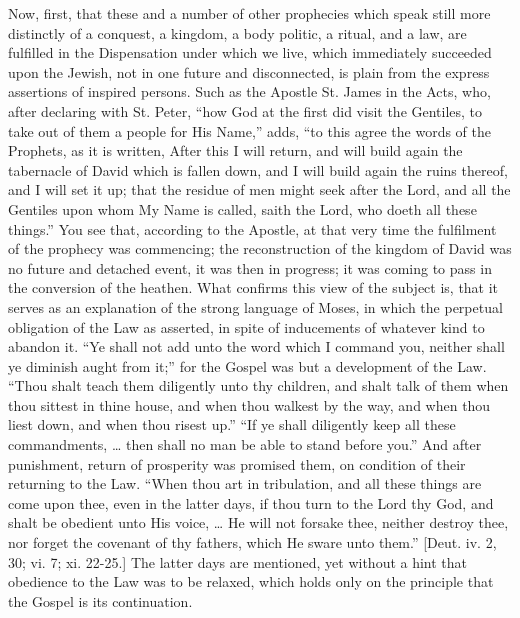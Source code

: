 Now, first, that these and a number of other prophecies which speak
still more distinctly of a conquest, a kingdom, a body politic, a
ritual, and a law, are fulfilled in the Dispensation under which we
live, which immediately succeeded upon the Jewish, not in one future
and disconnected, is plain from the express assertions of inspired
persons. Such as the Apostle St. James in the Acts, who, after
declaring with St. Peter, ``how God at the first did visit the
Gentiles, to take out of them a people for His Name,'' adds,
``to this agree the words of the Prophets, as it is written, After
this I will return, and will build again the tabernacle of David which
is fallen down, and I will build again the ruins thereof, and I will
set it up; that the residue of men might seek after the Lord, and all
the Gentiles upon whom My Name is called, saith the Lord, who doeth
all these things.'' You see that, according to the Apostle, at
that very time the fulfilment of the prophecy was commencing; the
reconstruction of the kingdom of David was no future and detached
event, it was then in progress; it was coming to pass in the
conversion of the heathen. What confirms this view of the subject is,
that it serves as an explanation of the strong language of Moses, in
which the perpetual obligation of the Law as asserted, in spite of
inducements of whatever kind to abandon it. ``Ye shall not add
unto the word which I command you, neither shall ye diminish aught
from it;'' for the Gospel was but a development of the Law.
``Thou shalt teach them diligently unto thy children, and shalt
talk of them when thou sittest in thine house, and when thou walkest
by the way, and when thou liest down, and when thou risest up.''
``If ye shall diligently keep all these commandments, … then
shall no man be able to stand before you.'' And after punishment,
return of prosperity was promised them, on condition of their
returning to the Law. ``When thou art in tribulation, and all
these things are come upon thee, even in the latter days, if thou turn
to the Lord thy God, and shalt be obedient unto His voice, … He will
not forsake thee, neither destroy thee, nor forget the covenant of thy
fathers, which He sware unto them.'' [Deut. iv. 2, 30; vi. 7; xi.
22-25.] The latter days are mentioned, yet without a hint that
obedience to the Law was to be relaxed, which holds only on the
principle that the Gospel is its continuation.

